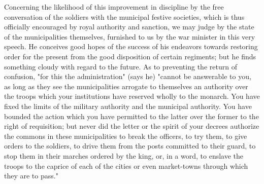 Concerning the likelihood of this improvement in discipline by the free conversation of the soldiers with the municipal festive societies, which is thus officially encouraged by royal authority and sanction, we may judge by the state of the municipalities themselves, furnished to us by the war minister in this very speech. He conceives good hopes of the success of his endeavors towards restoring order for the present from the good disposition of certain regiments; but he finds something cloudy with regard to the future. As to preventing the return of confusion, "for this the administration" (says he) "cannot be answerable to you, as long as they see the municipalities arrogate to themselves an authority over the troops which your institutions have reserved wholly to the monarch. You have fixed the limits of the military authority and the municipal authority. You have bounded the action which you have permitted to the latter over the former to the right of requisition; but never did the letter or the spirit of your decrees authorize the commons in these municipalities to break the officers, to try them, to give orders to the soldiers, to drive them from the posts committed to their guard, to stop them in their marches ordered by the king, or, in a word, to enslave the troops to the caprice of each of the cities or even market-towns through which they are to pass."

